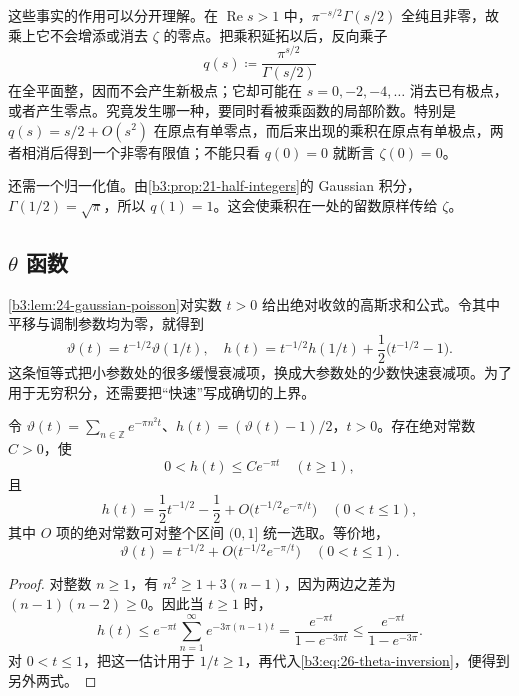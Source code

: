 \ProseParagraphBreak

这些事实的作用可以分开理解。在 \(\operatorname{Re}s>1\) 中，\(\pi^{-s/2}\Gamma(s/2)\) 全纯且非零，故乘上它不会增添或消去 \(\zeta\) 的零点。把乘积延拓以后，反向乘子
\[
 q(s)\coloneqq\frac{\pi^{s/2}}{\Gamma(s/2)}
\]
在全平面整，因而不会产生新极点；它却可能在 \(s=0,-2,-4,\ldots\) 消去已有极点，或者产生零点。究竟发生哪一种，要同时看被乘函数的局部阶数。特别是 \(q(s)=s/2+O(s^2)\) 在原点有单零点，而后来出现的乘积在原点有单极点，两者相消后得到一个非零有限值；不能只看 \(q(0)=0\) 就断言 \(\zeta(0)=0\)。

\ProseParagraphBreak

还需一个归一化值。由\cref{b3:prop:21-half-integers}的 Gaussian 积分，\(\Gamma(1/2)=\sqrt\pi\)，所以 \(q(1)=1\)。这会使乘积在一处的留数原样传给 \(\zeta\)。

\subsection{\texorpdfstring{\(\theta\)}{\AnalysisPdfTheta} 函数}
\label{b3:subsec:260203}

\cref{b3:lem:24-gaussian-poisson}对实数 \(t>0\) 给出绝对收敛的高斯求和公式。令其中平移与调制参数均为零，就得到
\begin{equation}\label{b3:eq:26-theta-inversion}
 \vartheta(t)=t^{-1/2}\vartheta(1/t),
 \quad
 h(t)=t^{-1/2}h(1/t)+\frac12\bigl(t^{-1/2}-1\bigr).
\end{equation}
这条恒等式把小参数处的很多缓慢衰减项，换成大参数处的少数快速衰减项。为了用于无穷积分，还需要把“快速”写成确切的上界。

\begin{proposition}\label{b3:prop:26-theta-endpoints}
令 \(\vartheta(t)=\sum_{n\in\mathbb Z}e^{-\pi n^2t}\)、\(h(t)=(\vartheta(t)-1)/2\)，\(t>0\)。存在绝对常数 \(C>0\)，使
\[
 0<h(t)\le Ce^{-\pi t}\quad(t\ge1),
\]
且
\[
 h(t)=\frac12t^{-1/2}-\frac12
       +O\bigl(t^{-1/2}e^{-\pi/t}\bigr)
 \quad(0<t\le1),
\]
其中 \(O\) 项的绝对常数可对整个区间 \((0,1]\) 统一选取。等价地，
\[
 \vartheta(t)=t^{-1/2}
       +O\bigl(t^{-1/2}e^{-\pi/t}\bigr)
 \quad(0<t\le1).
\]
\end{proposition}
\begin{proof}
对整数 \(n\ge1\)，有 \(n^2\ge1+3(n-1)\)，因为两边之差为 \((n-1)(n-2)\ge0\)。因此当 \(t\ge1\) 时，
\[
 h(t)\le e^{-\pi t}\sum_{n=1}^\infty e^{-3\pi(n-1)t}
 =\frac{e^{-\pi t}}{1-e^{-3\pi t}}
 \le\frac{e^{-\pi t}}{1-e^{-3\pi}}.
\]
对 \(0<t\le1\)，把这一估计用于 \(1/t\ge1\)，再代入\eqref{b3:eq:26-theta-inversion}，便得到另外两式。
\end{proof}

